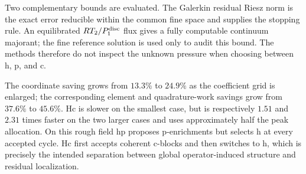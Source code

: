\documentclass[11pt]{article}
\numberwithin{algorithm}{section}
\theoremstyle{definition}\newtheorem{definition}[theorem]{Definition}
\theoremstyle{remark}\newtheorem{remark}[theorem]{Remark}
\begin{document}
Two complementary bounds are evaluated.  The Galerkin residual Riesz norm is
the exact error reducible within the common fine space and supplies the
stopping rule.  An equilibrated $RT_2/P_1^{\rm disc}$ flux gives a fully
computable continuum majorant; the fine reference solution is used only to
audit this bound.  The methods therefore do not inspect the unknown pressure
when choosing between h, p, and c.

\begin{table}[h]
\centering
\caption{Conforming SPE10 comparison under one refinement and stopping
protocol.  The target is relative to the initial reducible Galerkin error.
Terminal errors differ because a discrete enrichment can overshoot the common
threshold.  Wall times are indicative single-process measurements including
candidate search; memory is peak traced allocation.}
\label{tab:spe10-conforming-scaling}
\end{table}

The coordinate saving grows from $13.3\%$ to $24.9\%$ as the coefficient grid
is enlarged; the corresponding element and quadrature-work savings grow from
$37.6\%$ to $45.6\%$.  Hc is slower on the smallest case, but is respectively
$1.51$ and $2.31$ times faster on the two larger cases and uses approximately
half the peak allocation.  On this rough field hp proposes p-enrichments but
selects h at every accepted cycle.  Hc first accepts coherent c-blocks and
then switches to h, which is precisely the intended separation between global
operator-induced structure and residual localization.
\end{document}
